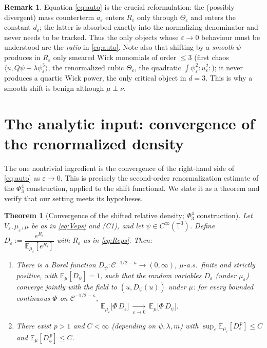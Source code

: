 \documentclass[12pt]{article}
\newcommand{\bT}{\mathbb{T}}
\newcommand{\bE}{\mathbb{E}}
\newcommand{\Wick}[1]{{:}#1{:}}
\newcommand{\eps}{\varepsilon}
\newcommand{\kp}{\kappa}
\theoremstyle{plain}
\newtheorem{theorem}{Theorem}
\theoremstyle{definition}
\newtheorem{remark}{Remark}
\begin{document}
\begin{remark}\label{rem:why}
Equation \eqref{eq:auto} is the crucial reformulation: the (possibly divergent) mass
counterterm $a_\eps$ enters $R_\eps$ only through $\Theta_\eps$ and enters the constant
$d_\eps$; the latter is absorbed exactly into the normalizing denominator and never
needs to be tracked. Thus the only objects whose $\eps\to0$ behaviour must be
understood are the \emph{ratio} in \eqref{eq:auto}. Note also that shifting by a
\emph{smooth} $\psi$ produces in $R_\eps$ only smeared Wick monomials of order $\le3$
(first chaos $\langle u,Q\psi+\lambda\psi_\eps^3\rangle$, the renormalized cubic
$\Theta_\eps$, the quadratic $\int\psi_\eps^2\Wick{u_\eps^2}$); it never produces a
quartic Wick power, the only critical object in $d=3$. This is why a smooth shift is
benign although $\mu\perp\nu$.
\end{remark}

\section{The analytic input: convergence of the renormalized density}\label{sec:input}

The one nontrivial ingredient is the convergence of the right-hand side of
\eqref{eq:auto} as $\eps\to0$. This is precisely the second-order renormalization
estimate of the $\Phi^4_3$ construction, applied to the shift functional. We state it
as a theorem and verify that our setting meets its hypotheses.

\begin{theorem}[Convergence of the shifted relative density; $\Phi^4_3$ construction]
\label{thm:input}
Let $V_\eps,\mu_\eps,\mu$ be as in \eqref{eq:Veps} and {\rm (C1)}, and let $\psi\in
C^\infty(\bT^3)$. Define $D_\eps:=\dfrac{e^{R_\eps}}{\bE_{\mu_\eps}[e^{R_\eps}]}$ with
$R_\eps$ as in \eqref{eq:Reps}. Then:
\begin{enumerate}
\item[(a)] There is a Borel function $D_\psi:\mathcal{C}^{-1/2-\kp}\to(0,\infty)$,
$\mu$-a.s.\ finite and strictly positive, with $\bE_\mu[D_\psi]=1$, such that the
random variables $D_\eps$ (under $\mu_\eps$) converge jointly with the field to
$(u,D_\psi(u))$ under $\mu$: for every bounded continuous $\Phi$ on
$\mathcal{C}^{-1/2-\kp}$,
\begin{equation}\label{eq:input-conv}
\bE_{\mu_\eps}\!\big[\Phi\,D_\eps\big]\ \xrightarrow[\eps\to0]{}\ \bE_\mu\!\big[\Phi\,D_\psi\big].
\end{equation}
\item[(b)] There exist $p>1$ and $C<\infty$ (depending on $\psi,\lambda,m$) with
$\sup_\eps\bE_{\mu_\eps}[D_\eps^{\,p}]\le C$ and $\bE_\mu[D_\psi^{\,p}]\le C$.
\end{enumerate}
\end{theorem}
\end{document}

